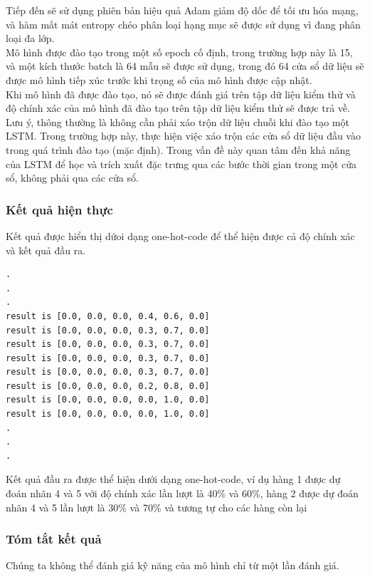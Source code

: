 Tiếp đến sẽ sử dụng phiên bản hiệu quả Adam giảm độ dốc để tối ưu hóa mạng, và hàm mất mát entropy chéo phân loại hạng mục sẽ được sử dụng vì đang phân loại đa lớp.\\

Mô hình được đào tạo trong một số epoch cố định, trong trường hợp này là 15, và một kích thước batch là 64 mẫu sẽ được sử dụng, trong đó 64 cửa sổ dữ liệu sẽ được mô hình tiếp xúc trước khi trọng số của mô hình được cập nhật.\\

Khi mô hình đã được đào tạo, nó sẽ được đánh giá trên tập dữ liệu kiểm thử và độ chính xác của mô hình đã đào tạo trên tập dữ liệu kiểm thử sẽ được trả về.\\

Lưu ý, thông thường là không cần phải xáo trộn dữ liệu chuỗi khi đào tạo một LSTM. Trong trường hợp này, thực hiện việc xáo trộn các cửa sổ dữ liệu đầu vào trong quá trình đào tạo (mặc định). Trong vấn đề này quan tâm đến khả năng của LSTM để học và trích xuất đặc trưng qua các bước thời gian trong một cửa sổ, không phải qua các cửa sổ.\\


\subsubsection{Kết quả hiện thực }
\indent Kết quả được hiển thị dứoi dạng one-hot-code để thể hiện được cả độ chính xác và kết quả đầu ra.

\begin{lstlisting}
.
.
.
result is [0.0, 0.0, 0.0, 0.4, 0.6, 0.0]
result is [0.0, 0.0, 0.0, 0.3, 0.7, 0.0]
result is [0.0, 0.0, 0.0, 0.3, 0.7, 0.0]
result is [0.0, 0.0, 0.0, 0.3, 0.7, 0.0]
result is [0.0, 0.0, 0.0, 0.3, 0.7, 0.0]
result is [0.0, 0.0, 0.0, 0.2, 0.8, 0.0]
result is [0.0, 0.0, 0.0, 0.0, 1.0, 0.0]
result is [0.0, 0.0, 0.0, 0.0, 1.0, 0.0]
.
.
.
\end{lstlisting}

\indent Kết quả đầu ra được thể hiện dưới dạng one-hot-code, ví dụ hàng 1 được dự đoán nhãn 4 và 5 với độ chính xác lần lượt là 40\% và 60\%, hàng 2 được dự đoán nhãn 4 và 5 lần lượt là 30\% và 70\% và tương tự cho các hàng còn lại


\subsubsection{Tóm tắt kết quả }

Chúng ta không thể đánh giá kỹ năng của mô hình chỉ từ một lần đánh giá.\\

